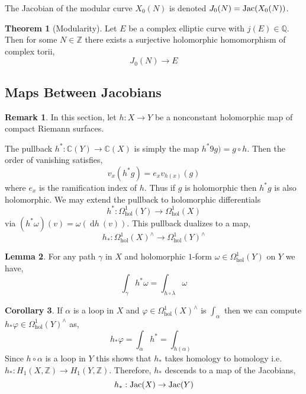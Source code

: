 \documentclass{article}
\newcommand{\Z}{\mathbb{Z}}
\newcommand{\Q}{\mathbb{Q}}
\newcommand{\C}{\mathbb{C}}
\renewcommand{\d}[1]{\: \mathrm{d}#1 \:}
\theoremstyle{definition}
\newtheorem{theorem}{Theorem}[section]
\newtheorem{lemma}[theorem]{Lemma}
\newtheorem{corollary}[theorem]{Corollary}
\newtheorem{remark}{Remark}[section]
\newenvironment{definition}[1][Definition:]{\begin{trivlist}
\item[\hskip \labelsep {\bfseries #1}]}{\end{trivlist}}
\begin{document}
\begin{definition}
The Jacobian of the modular curve $X_0(N)$ is denoted $J_0(N) = \mathrm{Jac}(X_0(N))$.
\end{definition}

\begin{theorem}[Modularity]
Let $E$ be a complex elliptic curve with $j(E) \in \Q$. Then for some $N \in \Z$ there exists a surjective holomorphic homomorphism of complex torii,
\[ J_0(N) \to E \]
\end{theorem}

\subsection{Maps Between Jacobians}

\begin{remark}
In this section, let $h : X \to Y$ be a nonconstant holomorphic map of compact Riemann surfaces.
\end{remark}

\begin{definition}
The pullback $h^* : \C(Y) \to \C(X)$ is simply the map $h^*9g) = g \circ h$. Then the order of vanishing satisfies,
\[ v_x(h^*g) = e_x v_{h(x)}(g) \]
where $e_x$ is the ramification index of $h$. Thus if $g$ is holomorphic then $h^* g$ is also holomorphic. We may extend the pullback to holomorphic differentials
\[ h^* : \Omega^1_{\text{hol}}(Y) \to \Omega^1_{\text{hol}}(X) \]
via $(h^* \omega)(v) = \omega(\d{h}(v))$. This pullback dualizes to a map,
\[ h_* : \Omega^1_{\text{hol}}(X)^\wedge \to \Omega^1_{\text{hol}}(Y)^\wedge \]
\end{definition}

\begin{lemma}
For any path $\gamma$ in $X$ and holomorphic $1$-form $\omega \in \Omega^1_{\text{hol}}(Y)$ on $Y$ we have,
\[ \int_\gamma h^* \omega = \int_{h \circ \lambda} \omega \]
\end{lemma}

\begin{corollary}
If $\alpha$ is a loop in $X$ and $\varphi \in \Omega^1_{\text{hol}}(X)^\wedge$ is $\int_\alpha$ then we can compute $h_* \varphi \in \Omega^1_{\text{hol}}(Y)^\wedge$ as,
\[ h_* \varphi = \int_\alpha h^* = \int_{h(\alpha)} \]
Since $h \circ \alpha$ is a loop in $Y$ this shows that $h_*$ takes homology to homology i.e. $h_* : H_1(X, \Z) \to H_1(Y, \Z)$. Therefore, $h_*$ descends to a map of the Jacobians,
\[ h_* : \mathrm{Jac}(X) \to \mathrm{Jac}(Y) \] 
\end{corollary}
\end{document}
